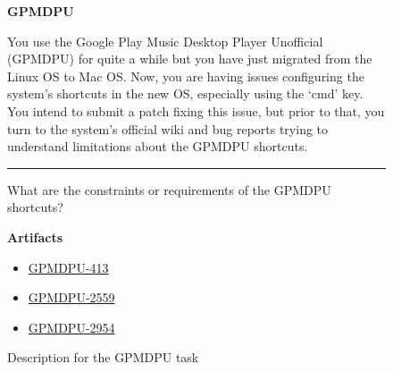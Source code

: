 \begin{figure}
\begin{mdframed}[backgroundcolor=gray!05] 
\begin{scriptsize}

{\large \textbf{GPMDPU}} \bigskip


You use the Google Play Music Desktop Player Unofficial (GPMDPU) for quite a while but you
have just migrated from the Linux OS to Mac OS. Now, you are having issues configuring the
system's shortcuts in the new OS, especially using the `cmd' key. You intend to submit a patch
fixing this issue, but prior to that, you turn to the system's official wiki and bug reports trying to
understand limitations about the GPMDPU shortcuts.


\begin{center}
\rule{10cm}{0.4pt}
\end{center}

What are the constraints or requirements of the GPMDPU shortcuts?

\medskip

\textbf{Artifacts}

\begin{itemize}
    \item \href{https://github.com/MarshallOfSound/Google-Play-Music-Desktop-Player-UNOFFICIAL-/issues/413}{GPMDPU-413}
    \item \href{https://github.com/MarshallOfSound/Google-Play-Music-Desktop-Player-UNOFFICIAL-/issues/2559}{GPMDPU-2559}
    \item \href{https://github.com/MarshallOfSound/Google-Play-Music-Desktop-Player-UNOFFICIAL-/issues/2954}{GPMDPU-2954}
\end{itemize}

\end{scriptsize}
\end{mdframed}
\caption{Description for the GPMDPU task}
\end{figure}

    
